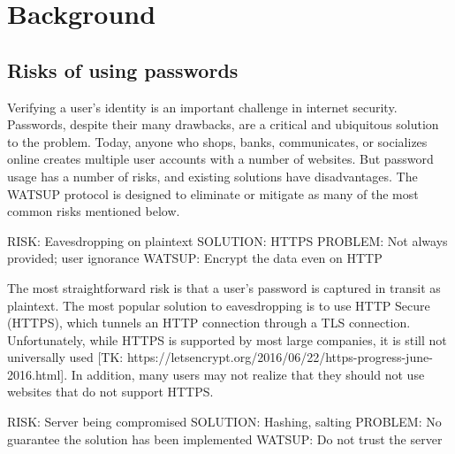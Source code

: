 \section{Background}
\label{sec:background}

\subsection{Risks of using passwords}

Verifying a user's identity is an important challenge in internet security. Passwords, despite their many drawbacks, are a critical and ubiquitous solution to the problem. Today, anyone who shops, banks, communicates, or socializes online creates multiple user accounts with a number of websites. But password usage has a number of risks, and existing solutions have disadvantages. The WATSUP protocol is designed to eliminate or mitigate as many of the most common risks mentioned below.


RISK: Eavesdropping on plaintext
SOLUTION: HTTPS
PROBLEM: Not always provided; user ignorance
WATSUP: Encrypt the data even on HTTP

The most straightforward risk is that a user's password is captured in transit as plaintext. The most popular solution to eavesdropping is to use HTTP Secure (HTTPS), which tunnels an HTTP connection through a TLS connection. Unfortunately, while HTTPS is supported by most large companies, it is still not universally used [TK: https://letsencrypt.org/2016/06/22/https-progress-june-2016.html]. In addition, many users may not realize that they should not use websites that do not support HTTPS.


RISK: Server being compromised
SOLUTION: Hashing, salting
PROBLEM: No guarantee the solution has been implemented
WATSUP: Do not trust the server


